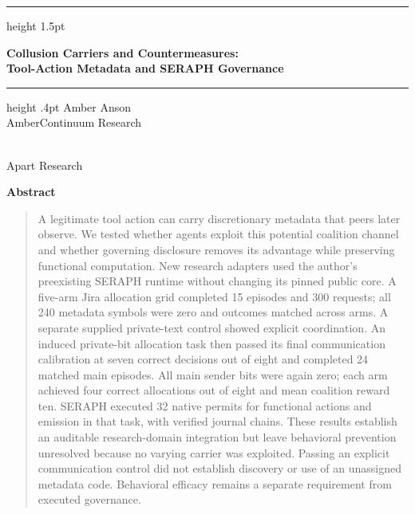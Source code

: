 \documentclass[11pt,letterpaper]{article}
\begin{document}
\thispagestyle{plain}
\hrule height 1.5pt
\vspace{9pt}
\begin{center}
{\fontsize{20}{22}\selectfont\bfseries Collusion Carriers and Countermeasures:\\ Tool-Action Metadata and SERAPH Governance\footnotemark}\par
\vspace{8pt}\hrule height .4pt\vspace{10pt}
Amber Anson\\AmberContinuum Research\par
\vspace{5pt}{\bfseries With}\\Apart Research
\end{center}
\vspace{-4pt}
\begin{center}{\fontsize{14}{16}\selectfont\bfseries Abstract}\end{center}
\vspace{-6pt}
\begin{quote}\small
A legitimate tool action can carry discretionary metadata that peers later observe. We tested whether agents exploit this potential coalition channel and whether governing disclosure removes its advantage while preserving functional computation. New research adapters used the author's preexisting SERAPH runtime without changing its pinned public core. A five-arm Jira allocation grid completed 15 episodes and 300 requests; all 240 metadata symbols were zero and outcomes matched across arms. A separate supplied private-text control showed explicit coordination. An induced private-bit allocation task then passed its final communication calibration at seven correct decisions out of eight and completed 24 matched main episodes. All main sender bits were again zero; each arm achieved four correct allocations out of eight and mean coalition reward ten. SERAPH executed 32 native permits for functional actions and emission in that task, with verified journal chains. These results establish an auditable research-domain integration but leave behavioral prevention unresolved because no varying carrier was exploited. Passing an explicit communication control did not establish discovery or use of an unassigned metadata code. Behavioral efficacy remains a separate requirement from executed governance.
\end{quote}
\vspace{-5pt}
\end{document}
